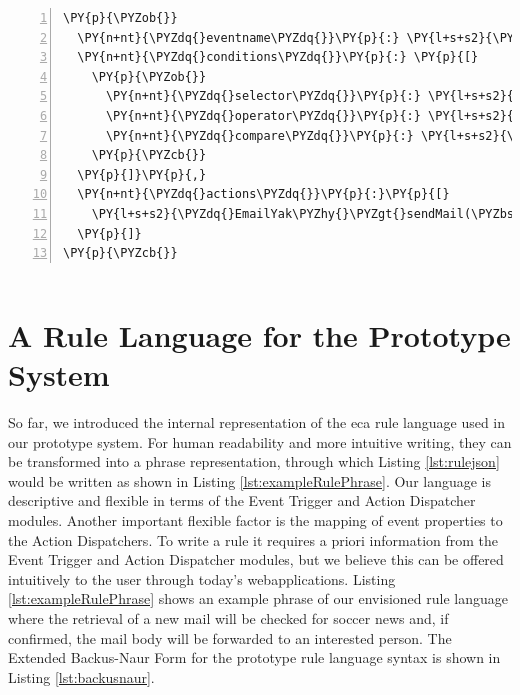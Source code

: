 \begin{Verbatim}[samepage=true,frame=single,fontsize=\footnotesize,commandchars=\\\{\},numbers=left,firstnumber=1,stepnumber=1,xleftmargin
=.3in]
\PY{p}{\PYZob{}}
  \PY{n+nt}{\PYZdq{}eventname\PYZdq{}}\PY{p}{:} \PY{l+s+s2}{\PYZdq{}news\PYZdq{}}\PY{p}{,}
  \PY{n+nt}{\PYZdq{}conditions\PYZdq{}}\PY{p}{:} \PY{p}{[}
    \PY{p}{\PYZob{}}
      \PY{n+nt}{\PYZdq{}selector\PYZdq{}}\PY{p}{:} \PY{l+s+s2}{\PYZdq{}.categories\PYZdq{}}\PY{p}{,}
      \PY{n+nt}{\PYZdq{}operator\PYZdq{}}\PY{p}{:} \PY{l+s+s2}{\PYZdq{}instr\PYZdq{}}\PY{p}{,}
      \PY{n+nt}{\PYZdq{}compare\PYZdq{}}\PY{p}{:} \PY{l+s+s2}{\PYZdq{}soccer\PYZdq{}}
    \PY{p}{\PYZcb{}}
  \PY{p}{]}\PY{p}{,}
  \PY{n+nt}{\PYZdq{}actions\PYZdq{}}\PY{p}{:}\PY{p}{[}
    \PY{l+s+s2}{\PYZdq{}EmailYak\PYZhy{}\PYZgt{}sendMail(\PYZbs{}\PYZdq{}fan@soccer.com\PYZbs{}\PYZdq{},\PYZbs{}\PYZdq{}News about soccer!\PYZbs{}\PYZdq{},\PYZbs{}\PYZdq{}\PYZsh{}\PYZob{} .body \PYZcb{}\PYZbs{}\PYZdq{})\PYZdq{}}
  \PY{p}{]}
\PY{p}{\PYZcb{}}
\end{Verbatim}
\vspace{-0.7cm}
\begin{lstlisting}[float=h,frame=no,label=lst:rulejson,caption=Rule Example expressed in \textrm{\acrshort{json}}]
\end{lstlisting}

\section{A Rule Language for the Prototype System}
So far, we introduced the internal representation of the \textrm{\acrshort{eca}} rule language used in our prototype system.
For human readability and more intuitive writing, they can be transformed into a phrase representation, through which Listing \ref{lst:rulejson} would be written as shown in Listing \ref{lst:exampleRulePhrase}.
Our language is descriptive and flexible in terms of the \textrm{Event Trigger} and \textrm{Action Dispatcher} modules.
Another important flexible factor is the mapping of event properties to the \textrm{Action Dispatchers}.
To write a rule it requires a priori information from the \textrm{Event Trigger} and \textrm{Action Dispatcher} modules, but we believe this can be offered intuitively to the user through today's \textrm{\glspl{webapplication}}.
Listing \ref{lst:exampleRulePhrase} shows an example phrase of our envisioned rule language where the retrieval of a new mail will be checked for soccer news and, if confirmed, the mail body will be forwarded to an interested person.
The Extended Backus-Naur Form for the prototype rule language syntax is shown in Listing \ref{lst:backusnaur}.


